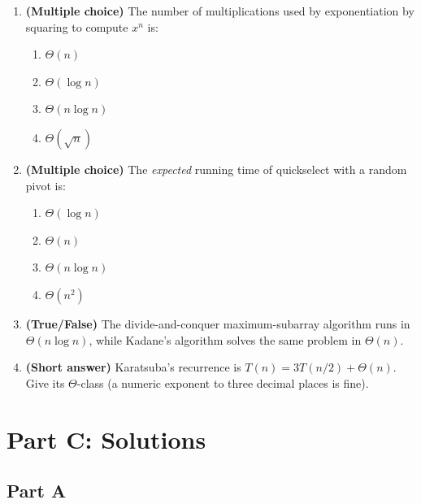 \documentclass[11pt]{article}
\begin{document}
\begin{enumerate}[label=\textbf{B\arabic*.}, leftmargin=2.2em]
\item \textbf{(Multiple choice)} The number of multiplications used by exponentiation by
squaring to compute $x^n$ is:
\begin{enumerate}[label=(\alph*)]
    \item $\Theta(n)$
    \item $\Theta(\log n)$
    \item $\Theta(n \log n)$
    \item $\Theta(\sqrt{n})$
\end{enumerate}

\item \textbf{(Multiple choice)} The \emph{expected} running time of quickselect with a
random pivot is:
\begin{enumerate}[label=(\alph*)]
    \item $\Theta(\log n)$
    \item $\Theta(n)$
    \item $\Theta(n \log n)$
    \item $\Theta(n^2)$
\end{enumerate}

\item \textbf{(True/False)} The divide-and-conquer maximum-subarray algorithm runs in
$\Theta(n \log n)$, while Kadane's algorithm solves the same problem in $\Theta(n)$.

\item \textbf{(Short answer)} Karatsuba's recurrence is $T(n) = 3T(n/2) + \Theta(n)$. Give
its $\Theta$-class (a numeric exponent to three decimal places is fine).

\end{enumerate}

\newpage
\section*{Part C: Solutions}

\subsection*{Part A}
\end{document}
